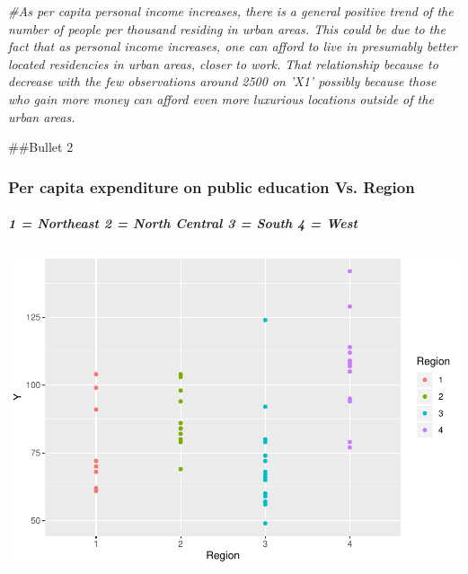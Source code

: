 \documentclass[]{article}
\newenvironment{Shaded}{\begin{snugshade}}{\end{snugshade}}
\newcommand{\CommentTok}[1]{\textcolor[rgb]{0.56,0.35,0.01}{\textit{#1}}}
\newcommand{\DataTypeTok}[1]{\textcolor[rgb]{0.13,0.29,0.53}{#1}}
\newcommand{\KeywordTok}[1]{\textcolor[rgb]{0.13,0.29,0.53}{\textbf{#1}}}
\newcommand{\NormalTok}[1]{#1}
\newcommand{\OperatorTok}[1]{\textcolor[rgb]{0.81,0.36,0.00}{\textbf{#1}}}
\newcommand{\StringTok}[1]{\textcolor[rgb]{0.31,0.60,0.02}{#1}}
\let\oldsubparagraph\subparagraph
\renewcommand{\subparagraph}[1]{\oldsubparagraph{#1}\mbox{}}
\begin{document}
\begin{Shaded}
\begin{Highlighting}[]
\CommentTok{#As per capita personal income increases, there is a general positive trend of the number of people per thousand residing in urban areas. This could be due to the fact that as personal income increases, one can afford to live in presumably better located residencies in urban areas, closer to work. That relationship because to decrease with the few observations around 2500 on 'X1' possibly because those who gain more money can afford even more luxurious locations outside of the urban areas. }
\end{Highlighting}
\end{Shaded}

\#\#Bullet 2

\hypertarget{per-capita-expenditure-on-public-education-vs.-region}{%
\subsubsection{Per capita expenditure on public education Vs.
Region}\label{per-capita-expenditure-on-public-education-vs.-region}}

\hypertarget{northeast-2-north-central-3-south-4-west}{%
\subparagraph{1 = Northeast \textbar{} 2 = North Central \textbar{} 3 =
South \textbar{} 4 =
West\textbar{}}\label{northeast-2-north-central-3-south-4-west}}

\begin{Shaded}
\end{Shaded}

\includegraphics{PS_answers_files/figure-latex/unnamed-chunk-9-1.pdf}
\end{document}
